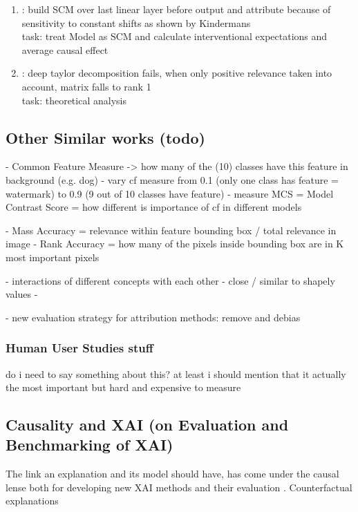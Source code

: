 \begin{enumerate}
      \item \cite{Chattopadhyay2019}: build SCM over last linear layer before output and attribute because of sensitivity to constant shifts as shown by Kindermans
            \\ task: treat Model as SCM and calculate interventional expectations and average causal effect
      \item \cite{Sixt2022}: deep taylor decomposition fails, when only positive relevance taken into account, matrix falls to rank 1 \\ task: theoretical analysis
\end{enumerate}

\subsection{Other Similar works (todo)}

\cite{Yang2019} 
- Common Feature Measure -> how many of the (10) classes have this feature in background (e.g. dog)
- vary cf measure from 0.1 (only one class has feature = watermark) to 0.9 (9 out of 10 classes have feature)
- measure MCS = Model Contrast Score = how different is importance of cf in different models

\cite{Arras2022}
- Mass Accuracy = relevance within feature bounding box / total relevance in image
- Rank Accuracy = how many of the pixels inside bounding box are in K most important pixels


\cite{Bluecher2022}
- interactions of different concepts with each other
- close / similar to shapely values
- 


\cite{Rong2022}
- new evaluation strategy for attribution methods: remove and debias

\subsubsection{Human User Studies stuff}
do i need to say something about this? at least i should mention that it actually the most important but hard and expensive to measure
\cite{Rong2023, }


\subsection{Causality and XAI (on Evaluation and Benchmarking of XAI)}
The link an explanation and its model should have, has come under the causal lense both for developing new XAI methods and their evaluation  . Counterfactual explanations


